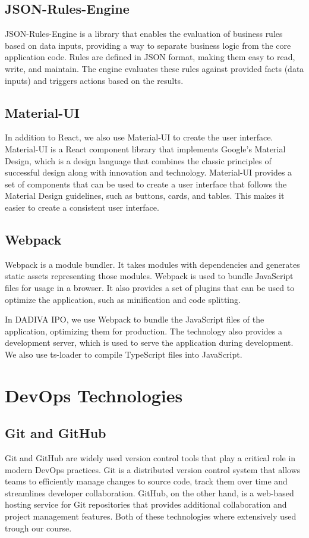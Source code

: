 \subsection{JSON-Rules-Engine}

JSON-Rules-Engine is a library that enables the evaluation of business rules based on data inputs, providing a way to separate business logic from the core application code. Rules are defined in JSON format, making them easy to read, write, and maintain. The engine evaluates these rules against provided facts (data inputs) and triggers actions based on the results.

\subsection{Material-UI}

In addition to React, we also use Material-UI to create the user interface. Material-UI is a React component library that implements Google’s Material Design, which is a design language that combines the classic principles of successful design along with innovation and technology. Material-UI provides a set of components that can be used to create a user interface that follows the Material Design guidelines, such as buttons, cards, and tables. This makes it easier to create a consistent user interface.

\subsection{Webpack}

Webpack is a module bundler. It takes modules with dependencies and generates static assets representing those modules. Webpack is used to bundle JavaScript files for usage in a browser. It also provides a set of plugins that can be used to optimize the application, such as minification and code splitting.

In DADIVA IPO, we use Webpack to bundle the JavaScript files of the application, optimizing them for production. The technology also provides a development server, which is used to serve the application during development. We also use ts-loader to compile TypeScript files into JavaScript.

\section{DevOps Technologies}

\subsection{ Git and GitHub}
Git and GitHub are widely used version control tools that play a critical role in modern DevOps practices. Git is a distributed version control system that allows teams to efficiently manage changes to source code, track them over time and streamlines developer collaboration. GitHub, on the other hand, is a web-based hosting service for Git repositories that provides additional collaboration and project management features. Both of these technologies where extensively used trough our course.
